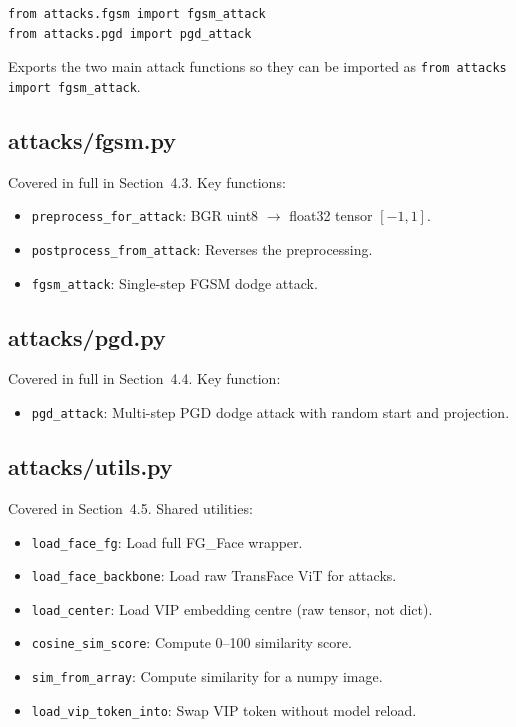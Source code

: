 \documentclass[12pt,a4paper]{article}
\begin{document}
\begin{lstlisting}[caption={attacks/\_\_init\_\_.py}]
from attacks.fgsm import fgsm_attack
from attacks.pgd import pgd_attack
\end{lstlisting}

Exports the two main attack functions so they can be imported as \texttt{from attacks import fgsm\_attack}.

\subsection{attacks/fgsm.py}
Covered in full in Section~4.3. Key functions:
\begin{itemize}
    \item \texttt{preprocess\_for\_attack}: BGR uint8 $\to$ float32 tensor $[-1,1]$.
    \item \texttt{postprocess\_from\_attack}: Reverses the preprocessing.
    \item \texttt{fgsm\_attack}: Single-step FGSM dodge attack.
\end{itemize}

\subsection{attacks/pgd.py}
Covered in full in Section~4.4. Key function:
\begin{itemize}
    \item \texttt{pgd\_attack}: Multi-step PGD dodge attack with random start and projection.
\end{itemize}

\subsection{attacks/utils.py}
Covered in Section~4.5. Shared utilities:
\begin{itemize}
    \item \texttt{load\_face\_fg}: Load full FG\_Face wrapper.
    \item \texttt{load\_face\_backbone}: Load raw TransFace ViT for attacks.
    \item \texttt{load\_center}: Load VIP embedding centre (raw tensor, not dict).
    \item \texttt{cosine\_sim\_score}: Compute 0--100 similarity score.
    \item \texttt{sim\_from\_array}: Compute similarity for a numpy image.
    \item \texttt{load\_vip\_token\_into}: Swap VIP token without model reload.
\end{itemize}
\end{document}
